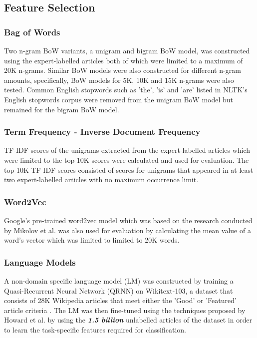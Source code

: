 \documentclass[a4paper,twoside,phd]{BYUPhys}
\begin{document}
\subsection{Feature Selection}
\label{sec:ModelFeatureSelection}

\subsubsection{Bag of Words}
\label{sec:FeatureSelectionBoW}
Two n-gram BoW variants, a unigram and bigram BoW model, was constructed using the expert-labelled articles both of which were limited to a maximum of 20K n-grams. Similar BoW models were also constructed for different n-gram amounts, specifically, BoW models for 5K, 10K and 15K n-grams were also tested. Common English stopwords such as 'the', 'is' and 'are' listed in NLTK's English stopwords corpus \cite{Bird2009} were removed from the unigram BoW model but remained for the bigram BoW model.

\subsubsection{Term Frequency - Inverse Document Frequency}
\label{sec:FeatureSelectionTFIDF}
TF-IDF scores of the unigrams extracted from the expert-labelled articles which were limited to the top 10K scores were calculated and used for evaluation. The top 10K TF-IDF scores consisted of scores for unigrams that appeared in at least two expert-labelled articles with no maximum occurrence limit.

\subsubsection{Word2Vec}
\label{sec:FeatureSelectionw2v}
Google's pre-trained word2vec model \cite{Googlew2v} which was based on the research conducted by Mikolov et al. \cite{Mikolov2013} was also used for evaluation by calculating the mean value of a word's vector which was limited to limited to 20K words.

\subsubsection{Language Models}
\label{sec:FeatureSelectionLM}

A non-domain specific language model (LM) was constructed by training a Quasi-Recurrent Neural Network (QRNN) \cite{bradbury2016quasi} on Wikitext-103, a dataset that consists of 28K Wikipedia articles that meet either the 'Good' or 'Featured' article criteria \cite{Merity2016}. The LM was then fine-tuned using the techniques proposed by Howard et al. \cite{Howard2018} by using the \textbf{\textit{1.5 billion}} unlabelled articles of the dataset in order to learn the task-specific features required for classification.
\end{document}
